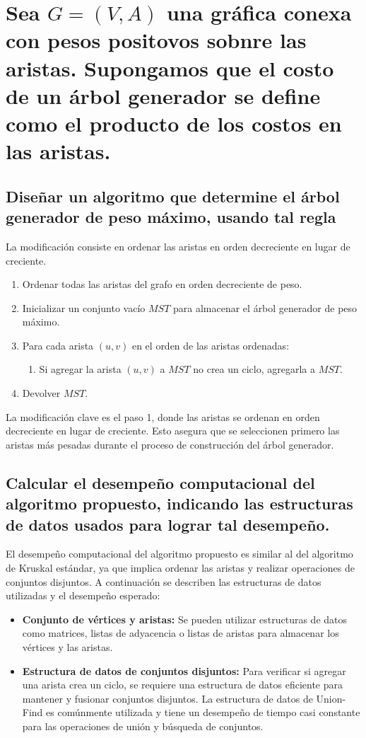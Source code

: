 \section{Sea $G = (V, A)$ una gráfica conexa con pesos positovos sobnre las aristas. Supongamos que el costo de un árbol generador se define como el producto de los costos en las aristas.}
\subsection{Diseñar un algoritmo que determine el árbol generador de peso máximo, usando tal regla}

La modificación consiste en ordenar las aristas en orden decreciente en lugar de creciente.

\begin{enumerate}
  \item Ordenar todas las aristas del grafo en orden decreciente de peso.
  \item Inicializar un conjunto vacío $MST$ para almacenar el árbol generador de peso máximo.
  \item Para cada arista $(u, v)$ en el orden de las aristas ordenadas:
  \begin{enumerate}
    \item Si agregar la arista $(u, v)$ a $MST$ no crea un ciclo, agregarla a $MST$.
  \end{enumerate}
  \item Devolver $MST$.
\end{enumerate}

La modificación clave es el paso 1, donde las aristas se ordenan en orden decreciente en lugar de creciente. Esto asegura que se seleccionen primero las aristas más pesadas durante el proceso de construcción del árbol generador.


\subsection{Calcular el desempeño computacional del algoritmo propuesto, indicando las estructuras de datos usados para lograr tal desempeño.}

El desempeño computacional del algoritmo propuesto es similar al del algoritmo de Kruskal estándar, ya que implica ordenar las aristas y realizar operaciones de conjuntos disjuntos. A continuación se describen las estructuras de datos utilizadas y el desempeño esperado:

\begin{itemize}
  \item \textbf{Conjunto de vértices y aristas:} Se pueden utilizar estructuras de datos como matrices, listas de adyacencia o listas de aristas para almacenar los vértices y las aristas.
  \item \textbf{Estructura de datos de conjuntos disjuntos:} Para verificar si agregar una arista crea un ciclo, se requiere una estructura de datos eficiente para mantener y fusionar conjuntos disjuntos. La estructura de datos de Union-Find es comúnmente utilizada y tiene un desempeño de tiempo casi constante para las operaciones de unión y búsqueda de conjuntos.
\end{itemize}

